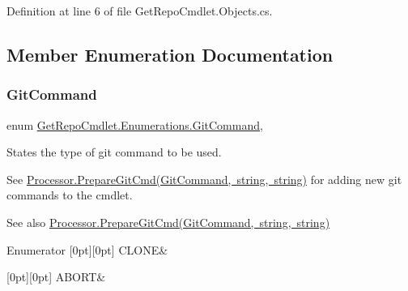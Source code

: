 Definition at line 6 of file Get\+Repo\+Cmdlet.\+Objects.\+cs.



\subsection{Member Enumeration Documentation}
\mbox{\label{class_get_repo_cmdlet_1_1_enumerations_a52683b5a6aca649a73b7bc9a076cc747}} 
\subsubsection{\texorpdfstring{Git\+Command}{GitCommand}}
{\footnotesize\ttfamily enum \mbox{\hyperlink{class_get_repo_cmdlet_1_1_enumerations_a52683b5a6aca649a73b7bc9a076cc747}{Get\+Repo\+Cmdlet.\+Enumerations.\+Git\+Command}}\hspace{0.3cm}{\ttfamily [strong]}, {\ttfamily [package]}}



States the type of git command to be used. 

See \mbox{\hyperlink{class_get_repo_cmdlet_1_1_processor_a9c532782d2575d5244440407103b4352}{Processor.\+Prepare\+Git\+Cmd(\+Git\+Command, string, string)}} for adding new git commands to the cmdlet. 

\begin{DoxySeeAlso}{See also}
\mbox{\hyperlink{class_get_repo_cmdlet_1_1_processor_a9c532782d2575d5244440407103b4352}{Processor.\+Prepare\+Git\+Cmd(\+Git\+Command, string, string)}}


\end{DoxySeeAlso}
\begin{DoxyEnumFields}{Enumerator}
[0pt][0pt]{}\mbox{\label{class_get_repo_cmdlet_1_1_enumerations_a52683b5a6aca649a73b7bc9a076cc747aa6ddc0995d7b58e0302675f581845cce}} 
C\+L\+O\+NE&\\
\hline

[0pt][0pt]{}\mbox{\label{class_get_repo_cmdlet_1_1_enumerations_a52683b5a6aca649a73b7bc9a076cc747a8d12a2ca7e5a64036d7251a3eda51a38}} 
A\+B\+O\+RT&\\
\hline

\end{DoxyEnumFields}


